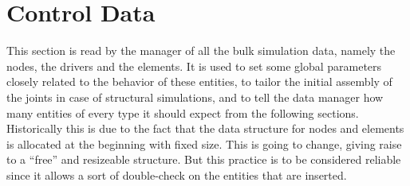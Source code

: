 %
%
%
%
%
% 
%
%

\chapter{Control Data}\label{sec:CONTROL-DATA}
This section is read by the manager of all the bulk simulation data, namely
the nodes, the drivers and the elements. It is used to set some global
parameters closely related to the behavior of these entities, to tailor the
initial assembly of the joints in case of structural simulations, and to
tell the data manager how many entities of every type it should expect from
the following sections. Historically this is due to the fact that the data
structure for nodes and elements is allocated at the beginning with fixed
size. This is going to change, giving raise to a ``free'' and resizeable
structure. But this practice is to be considered reliable since it allows a
sort of double-check on the entities that are inserted.

